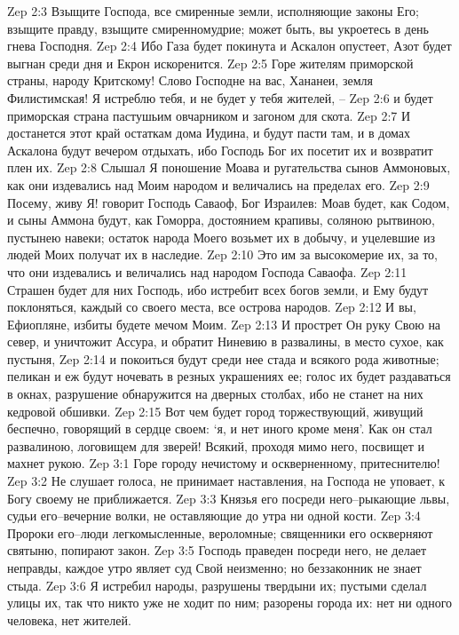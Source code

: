Zep 2:3  Взыщите Господа, все смиренные земли, исполняющие законы Его; взыщите правду, взыщите смиренномудрие; может быть, вы укроетесь в день гнева Господня.
Zep 2:4  Ибо Газа будет покинута и Аскалон опустеет, Азот будет выгнан среди дня и Екрон искоренится.
Zep 2:5  Горе жителям приморской страны, народу Критскому! Слово Господне на вас, Хананеи, земля Филистимская! Я истреблю тебя, и не будет у тебя жителей, --
Zep 2:6  и будет приморская страна пастушьим овчарником и загоном для скота.
Zep 2:7  И достанется этот край остаткам дома Иудина, и будут пасти там, и в домах Аскалона будут вечером отдыхать, ибо Господь Бог их посетит их и возвратит плен их.
Zep 2:8  Слышал Я поношение Моава и ругательства сынов Аммоновых, как они издевались над Моим народом и величались на пределах его.
Zep 2:9  Посему, живу Я! говорит Господь Саваоф, Бог Израилев: Моав будет, как Содом, и сыны Аммона будут, как Гоморра, достоянием крапивы, соляною рытвиною, пустынею навеки; остаток народа Моего возьмет их в добычу, и уцелевшие из людей Моих получат их в наследие.
Zep 2:10  Это им за высокомерие их, за то, что они издевались и величались над народом Господа Саваофа.
Zep 2:11  Страшен будет для них Господь, ибо истребит всех богов земли, и Ему будут поклоняться, каждый со своего места, все острова народов.
Zep 2:12  И вы, Ефиопляне, избиты будете мечом Моим.
Zep 2:13  И прострет Он руку Свою на север, и уничтожит Ассура, и обратит Ниневию в развалины, в место сухое, как пустыня,
Zep 2:14  и покоиться будут среди нее стада и всякого рода животные; пеликан и еж будут ночевать в резных украшениях ее; голос их будет раздаваться в окнах, разрушение обнаружится на дверных столбах, ибо не станет на них кедровой обшивки.
Zep 2:15  Вот чем будет город торжествующий, живущий беспечно, говорящий в сердце своем: `я, и нет иного кроме меня'. Как он стал развалиною, логовищем для зверей! Всякий, проходя мимо него, посвищет и махнет рукою.
Zep 3:1  Горе городу нечистому и оскверненному, притеснителю!
Zep 3:2  Не слушает голоса, не принимает наставления, на Господа не уповает, к Богу своему не приближается.
Zep 3:3  Князья его посреди него--рыкающие львы, судьи его--вечерние волки, не оставляющие до утра ни одной кости.
Zep 3:4  Пророки его--люди легкомысленные, вероломные; священники его оскверняют святыню, попирают закон.
Zep 3:5  Господь праведен посреди него, не делает неправды, каждое утро являет суд Свой неизменно; но беззаконник не знает стыда.
Zep 3:6  Я истребил народы, разрушены твердыни их; пустыми сделал улицы их, так что никто уже не ходит по ним; разорены города их: нет ни одного человека, нет жителей.
